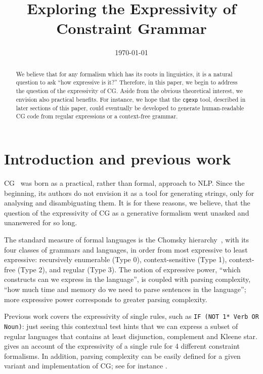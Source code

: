 \documentclass[11pt]{article}
\title{Exploring the Expressivity of Constraint Grammar}
\date{\today}
\begin{document}
\maketitle

\begin{abstract}
  We believe that for any formalism which has its roots in linguistics, it is a
  natural question to ask ``how expressive is it?'' Therefore, in this paper, we
  begin to address the question of the expressivity of CG.
  Aside from the obvious theoretical interest, we envision also practical
  benefits. For instance, we hope that the \texttt{cgexp} tool, described in
  later sections of this paper, could eventually be developed to generate
  human-readable CG code from regular expressions or a context-free grammar. 
\end{abstract}

\section{Introduction and previous work}

CG~\cite{karlsson1995constraint} was born as a practical, rather than formal, 
approach to NLP. 
Since the beginning, its authors do not envision it as a tool for 
generating strings, only for analysing and disambiguating them.
It is for these reasons, we believe, that the question of the expressivity of CG
as a generative formalism went unasked and unanswered for so long.

The standard measure of formal languages is the Chomsky
hierarchy~\cite{chomsky1956hierarchy}, with its four classes of grammars and
languages, in order from most expressive to least expressive: recursively
enumerable (Type 0), context-sensitive (Type 1), context-free (Type 2), and
regular (Type 3). The notion of expressive power, ``which constructs can we
express in the language'', is coupled with parsing complexity, ``how much time
and memory do we need to parse sentences in the language''; more expressive
power corresponds to greater parsing complexity.


Previous work covers the expressivity of single rules, such as \texttt{IF (NOT
  1* Verb OR Noun)}: just seeing this contextual test hints that we can express
a subset of regular languages that contains at least disjunction, complement and
Kleene star.  gives an account of the expressivity of
a single rule for 4 different constraint formalisms. In addition, parsing
complexity can be easily defined for a given variant and implementation of CG;
see for instance .
\end{document}
